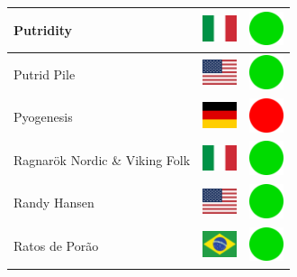 \documentclass[12pt, a4paper, twoside]{report}
\begin{document}
\begin{center}
\begin{longtable}{|p{5cm}|p{2cm}|p{2cm}|}
 Putridity                                                  & \includegraphics[width=1cm]{../4x3/it} &   \includegraphics[width=1cm]{../likes/y} \\ \hline
 Putrid Pile                                                & \includegraphics[width=1cm]{../4x3/us} &   \includegraphics[width=1cm]{../likes/y} \\ \hline
 Pyogenesis                                                 & \includegraphics[width=1cm]{../4x3/de} &   \includegraphics[width=1cm]{../likes/n} \\ \hline
 Ragnarök Nordic \& Viking Folk                             & \includegraphics[width=1cm]{../4x3/it} &   \includegraphics[width=1cm]{../likes/y} \\ \hline
 Randy Hansen                                               & \includegraphics[width=1cm]{../4x3/us} &   \includegraphics[width=1cm]{../likes/y} \\ \hline
 Ratos de Porão                                             & \includegraphics[width=1cm]{../4x3/br} &   \includegraphics[width=1cm]{../likes/y} \\ \hline

\end{longtable}
\end{center}
\end{document}
